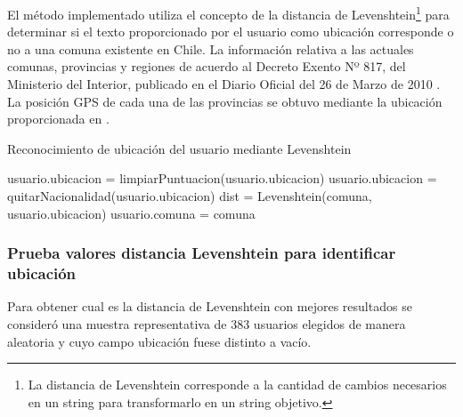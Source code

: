 El método implementado utiliza el concepto de la distancia de Levenshtein\footnote{La distancia de Levenshtein corresponde a la cantidad de cambios necesarios en un string para transformarlo en un string objetivo.} para determinar si el texto proporcionado por el usuario como ubicación corresponde o no a una comuna existente en Chile. La información relativa a las actuales comunas, provincias y regiones de acuerdo al Decreto Exento Nº 817, del Ministerio del Interior, publicado en el Diario Oficial del 26 de Marzo de 2010 \cite{listaCodigosProvincias}. La posición GPS de cada una de las provincias se obtuvo mediante la ubicación proporcionada en \cite{dicesmapas}.

\begin{algorithm}
	\caption{Reconocimiento de ubicación del usuario mediante Levenshtein}\label{ciudadesLeven2}
	\begin{algorithmic}[1]
		\State usuario.ubicacion = limpiarPuntuacion(usuario.ubicacion)\;
		\State usuario.ubicacion = quitarNacionalidad(usuario.ubicacion)\;
		\State dist = Levenshtein(comuna, usuario.ubicacion)\;
		\State usuario.comuna = comuna\;
		\EndIf
		\EndFor
		\EndFor
		\EndFunction
	\end{algorithmic}
\end{algorithm}


\subsubsection{Prueba valores distancia Levenshtein para identificar ubicación}

Para obtener cual es la distancia de Levenshtein con mejores resultados se consideró una muestra representativa de 383 usuarios elegidos de manera aleatoria y cuyo campo ubicación fuese distinto a vacío.


